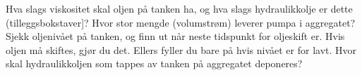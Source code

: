 \documentclass[12pt,a4paper]{article}
\def\oppgave{
		}
\begin{document}
	Hva slags viskositet skal oljen på tanken ha, og hva slags hydraulikkolje er dette (tilleggsbokstaver]?
	Hvor stor mengde (volumstrøm) leverer pumpa i aggregatet?
	Sjekk oljenivået på tanken, og finn ut når neste tidspunkt for oljeskift er. Hvis oljen må skiftes, gjør du det. Ellers fyller du bare på hvis nivået er for lavt.
	Hvor skal hydraulikkoljen som tappes av tanken på aggregatet deponeres?
\vskip 5pt 
\vskip 2.5pt 
\oppgave{}%
\vskip 2.5pt 
\vskip 5pt 
\vskip 2.5pt 
\end{document}
